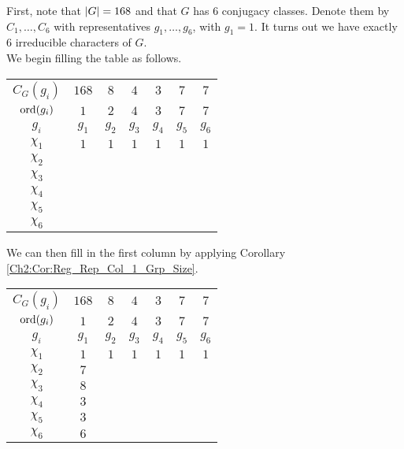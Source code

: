 \begin{boxexample}[Constructing the Character Table of $G = \PSL{2, 7}$]
    First, note that $\left\lvert G \right\rvert = 168$ and that $G$ has $6$ conjugacy classes. Denote them by $C_1, \ldots, C_6$ with representatives $g_1, \ldots, g_6$, with $g_1 = 1$. It turns out we have exactly $6$ irreducible characters of $G$. \\ %

    We begin filling the table as follows.
    \begin{table}[H]
        \centering
        \begin{tabular}{|c|cccccc|}
            $C_G(g_i)$ & $168$ & $8$ & $4$ & $3$ & $7$ & $7$ \\
            $\operatorname{ord}\!\left( g_i \right)$ & $1$ & $2$ & $4$ & $3$ & $7$ & $7$ \\
            $g_i$ & $g_1$ & $g_2$ & $g_3$ & $g_4$ & $g_5$ & $g_6$ \\
            \hline
            $\chi_1$ & $1$ & $1$ & $1$ & $1$ & $1$ & $1$ \\
            $\chi_2$ & & & & & & \\
            $\chi_3$ & & & & & & \\
            $\chi_4$ & & & & & & \\
            $\chi_5$ & & & & & & \\
            $\chi_6$ & & & & & & \\
        \end{tabular}
    \end{table}
    We can then fill in the first column by applying Corollary \ref{Ch2:Cor:Reg_Rep_Col_1_Grp_Size}.
    \begin{table}[H]
        \centering
        \begin{tabular}{|c|cccccc|}
            $C_G(g_i)$ & $168$ & $8$ & $4$ & $3$ & $7$ & $7$ \\
            $\operatorname{ord}\!\left( g_i \right)$ & $1$ & $2$ & $4$ & $3$ & $7$ & $7$ \\
            $g_i$ & $g_1$ & $g_2$ & $g_3$ & $g_4$ & $g_5$ & $g_6$ \\
            \hline
            $\chi_1$ & $1$ & $1$ & $1$ & $1$ & $1$ & $1$ \\
            $\chi_2$ & $7$ & & & & & \\
            $\chi_3$ & $8$ & & & & & \\
            $\chi_4$ & $3$ & & & & & \\
            $\chi_5$ & $3$ & & & & & \\
            $\chi_6$ & $6$ & & & & & \\

\end{tabular}
\end{table}
\end{boxexample}
